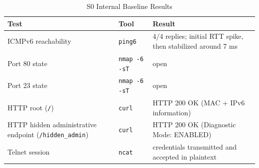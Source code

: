 \begin{table}[H]
    \centering
    \caption{S0 Internal Baseline Results}
    \label{tab:s0-internal-baseline-results}
    \begin{tabularx}{\textwidth}{p{} p{} L}
        \toprule
        \textbf{\color{white}Test} & \textbf{\color{white}Tool} & \textbf{\color{white}Result} \\
        \midrule
        ICMPv6 reachability & \texttt{ping6} & 4/4 replies; initial RTT spike, then stabilized around 7 ms \\
        Port 80 state & \texttt{nmap -6 -sT} & open \\
        Port 23 state & \texttt{nmap -6 -sT} & open \\
        HTTP root (\texttt{/}) & \texttt{curl} & HTTP 200 OK (MAC + IPv6 information) \\
        HTTP hidden administrative endpoint (\texttt{/hidden\_admin}) & \texttt{curl} & HTTP 200 OK (Diagnostic Mode: ENABLED) \\
        Telnet session & \texttt{ncat} & credentials transmitted and accepted in plaintext \\
        \bottomrule
    \end{tabularx}
\end{table}
